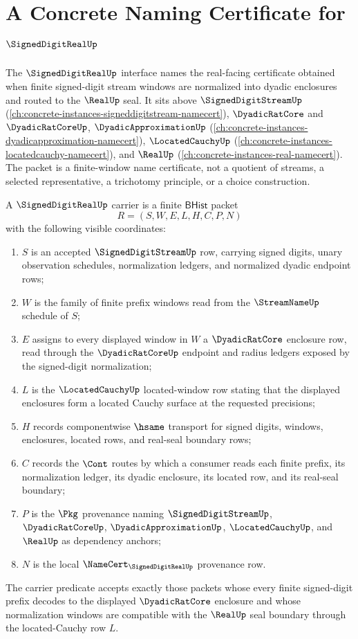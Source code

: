 \chapter{A Concrete Naming Certificate for $\SignedDigitRealUp$}
\label{ch:concrete-instances-signeddigitreal-namecert}

The $\SignedDigitRealUp$ interface names the real-facing certificate obtained when finite signed-digit stream windows are normalized into dyadic enclosures and routed to the $\RealUp$ seal. It sits above $\SignedDigitStreamUp$ (\autoref{ch:concrete-instances-signeddigitstream-namecert}), $\DyadicRatCore$ and $\DyadicRatCoreUp$, $\DyadicApproximationUp$ (\autoref{ch:concrete-instances-dyadicapproximation-namecert}), $\LocatedCauchyUp$ (\autoref{ch:concrete-instances-locatedcauchy-namecert}), and $\RealUp$ (\autoref{ch:concrete-instances-real-namecert}). The packet is a finite-window name certificate, not a quotient of streams, a selected representative, a trichotomy principle, or a choice construction.

\begin{definition}
\label{def:signed-digit-real-carrier}
A $\SignedDigitRealUp$ carrier is a finite $\mathsf{BHist}$ packet
$$
R=(S,W,E,L,H,C,P,N)
$$
with the following visible coordinates:
\begin{enumerate}
\item $S$ is an accepted $\SignedDigitStreamUp$ row, carrying signed digits, unary observation schedules, normalization ledgers, and normalized dyadic endpoint rows;
\item $W$ is the family of finite prefix windows read from the $\StreamNameUp$ schedule of $S$;
\item $E$ assigns to every displayed window in $W$ a $\DyadicRatCore$ enclosure row, read through the $\DyadicRatCoreUp$ endpoint and radius ledgers exposed by the signed-digit normalization;
\item $L$ is the $\LocatedCauchyUp$ located-window row stating that the displayed enclosures form a located Cauchy surface at the requested precisions;
\item $H$ records componentwise $\hsame$ transport for signed digits, windows, enclosures, located rows, and real-seal boundary rows;
\item $C$ records the $\Cont$ routes by which a consumer reads each finite prefix, its normalization ledger, its dyadic enclosure, its located row, and its real-seal boundary;
\item $P$ is the $\Pkg$ provenance naming $\SignedDigitStreamUp$, $\DyadicRatCoreUp$, $\DyadicApproximationUp$, $\LocatedCauchyUp$, and $\RealUp$ as dependency anchors;
\item $N$ is the local $\NameCert_{\SignedDigitRealUp}$ provenance row.
\end{enumerate}
The carrier predicate accepts exactly those packets whose every finite signed-digit prefix decodes to the displayed $\DyadicRatCore$ enclosure and whose normalization windows are compatible with the $\RealUp$ seal boundary through the located-Cauchy row $L$.
\end{definition}

